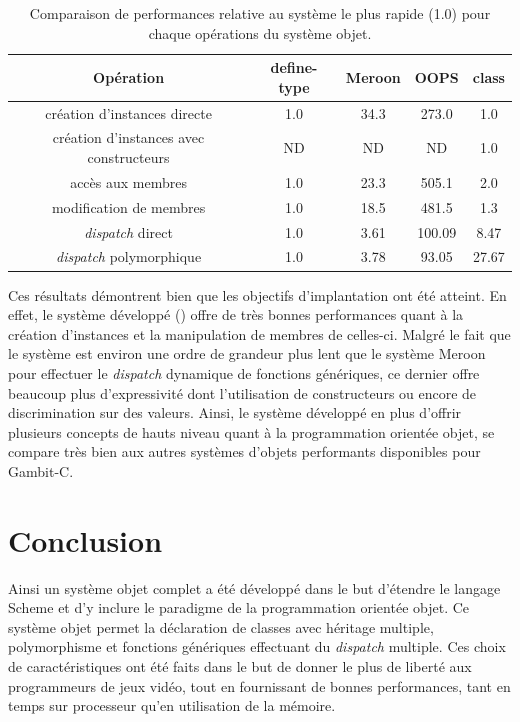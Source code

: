 \documentclass[12pt,oneside,letterpaper,francais]{book}
\newcommand{\scheme}[1]{\selectlanguage{english}{\tt #1}\selectlanguage{french}}
\begin{document}
\begin{table}
  \center
  \begin{tabular}{ccccc}
    \hline
    Opération & define-type & Meroon & OOPS & class \\
    \hline \hline
    création d'instances directe            & 1.0 & 34.3 & 273.0 & 1.0\\
    création d'instances avec constructeurs & ND  & ND  & ND   & 1.0\\
    accès aux membres                       & 1.0 & 23.3 & 505.1 & 2.0\\
    modification de membres                 & 1.0 & 18.5 & 481.5 & 1.3\\
    \textit{dispatch} direct                & 1.0 & 3.61 & 100.09 & 8.47\\
    \textit{dispatch} polymorphique         & 1.0 & 3.78 & 93.05 & 27.67\\
    \hline
  \end{tabular}
  \caption{Comparaison de performances relative au système le plus
    rapide (1.0) pour chaque opérations du système objet.}
  \label{OO:bench-rel}
\end{table}

Ces résultats démontrent bien que les objectifs d'implantation ont été
atteint. En effet, le système développé (\scheme{class}) offre de très
bonnes performances quant à la création d'instances et la manipulation
de membres de celles-ci. Malgré le fait que le système est environ une
ordre de grandeur plus lent que le système Meroon pour effectuer le
\textit{dispatch} dynamique de fonctions génériques, ce dernier offre
beaucoup plus d'expressivité dont l'utilisation de constructeurs ou
encore de discrimination sur des valeurs. Ainsi, le système développé
en plus d'offrir plusieurs concepts de hauts niveau quant à la
programmation orientée objet, se compare très bien aux autres systèmes
d'objets performants disponibles pour Gambit-C.

\section{Conclusion}
Ainsi un système objet complet a été développé dans le but d'étendre
le langage Scheme et d'y inclure le paradigme de la programmation
orientée objet. Ce système objet permet la déclaration de classes avec
héritage multiple, polymorphisme et fonctions génériques effectuant du
\textit{dispatch} multiple. Ces choix de caractéristiques ont été
faits dans le but de donner le plus de liberté aux programmeurs de
jeux vidéo, tout en fournissant de bonnes performances, tant en temps
sur processeur qu'en utilisation de la mémoire.
\end{document}
